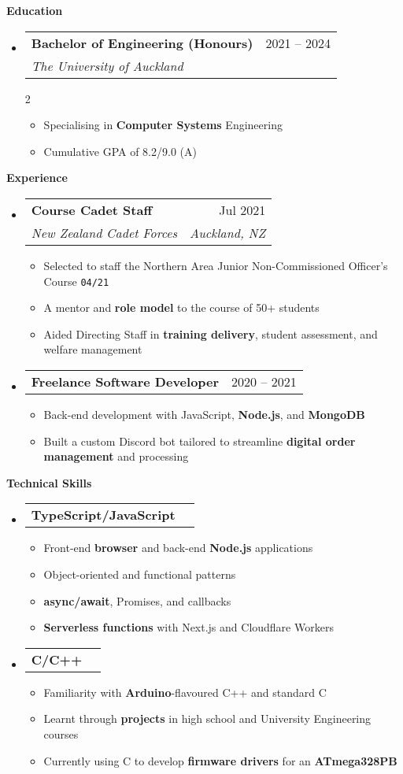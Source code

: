 \documentclass[11pt,a4paper]{article}[leftmargin=*]
\makeatletter
\def \entryspacing {-0pt}
\renewcommand{\section}[2]{\vspace{5pt}
  \colorbox{secondary}{\color{white}\raggedbottom\normalsize\textbf{{#1}{\hspace{7pt}#2}}}
}
\newcommand{\resumeEntryStart}{\begin{itemize}[leftmargin=2.5mm]}
\newcommand{\resumeEntryEnd}{\end{itemize}\vspace{\entryspacing}}
\newcommand{\resumeItemListStart}{\begin{itemize}[leftmargin=4.5mm]}
\newcommand{\resumeItemListEnd}{\end{itemize}}
\newcommand{\resumeItemListStartColumns}[2][-0.5]{\vspace*{#1\multicolsep}
\begin{multicols}{#2}\begin{itemize}[leftmargin=4.5mm]}
\newcommand{\resumeItemListEndColumns}[1][-0.5]{\end{itemize}\end{multicols}\vspace*{#1\multicolsep}}
\newcommand{\resumeItem}[1]{
  \item\small{
    {#1 \vspace{-2pt}}
  }
}
\newcommand{\resumeEntryTSDL}[4]{
  \vspace{-1pt}\item[]
    \begin{tabularx}{0.97\textwidth}{X@{\hspace{60pt}}r}
      \textbf{\color{primary}#1} & {\firabook\color{accent}\small#2} \\
      \textit{\color{accent}\small#3} & \textit{\color{accent}\small#4} \\
    \end{tabularx}\vspace{-6pt}
}
\newcommand{\resumeEntryTD}[2]{
  \vspace{-1pt}\item[]
    \begin{tabularx}{0.97\textwidth}{X@{\hspace{60pt}}r}
      \textbf{\color{primary}#1} & {\firabook\color{accent}\small#2} \\
    \end{tabularx}\vspace{-6pt}
}
\newcommand{\resumeBf}[1]{\small\textbf{\color{halfbold}#1}}
\makeatother
\begin{document}
\section{\faGraduationCap}{Education}

\resumeEntryStart
\resumeEntryTSDL
{Bachelor of Engineering (Honours)}{2021 -- 2024}
{The University of Auckland}{}
\resumeItemListStartColumns[0.5]{2}
\resumeItem {Specialising in \resumeBf{Computer Systems} Engineering}
\resumeItem {Cumulative GPA of 8.2/9.0 (A)}
\resumeItemListEndColumns
\resumeEntryEnd


\section{\faBriefcase}{Experience}

\resumeEntryStart
\resumeEntryTSDL
{Course Cadet Staff}{Jul 2021}
{New Zealand Cadet Forces}{Auckland, NZ}

\resumeItemListStart
\resumeItem {Selected to staff the Northern Area Junior Non-Commissioned Officer's Course \texttt{04/21}}
\resumeItem {A mentor and \resumeBf{role model} to the course of 50+ students}
\resumeItem {Aided Directing Staff in \resumeBf{training delivery}, student assessment, and welfare management}
\resumeItemListEnd
\resumeEntryEnd

\resumeEntryStart
\resumeEntryTD
{Freelance Software Developer}{2020 -- 2021}
\resumeItemListStart
\resumeItem {Back-end development with JavaScript, \resumeBf{Node.js}, and \resumeBf{MongoDB}}
\resumeItem {Built a custom Discord bot tailored to streamline \resumeBf{digital order management} and processing}
\resumeItemListEnd
\resumeEntryEnd


\section{\faCogs}{Technical Skills}

\resumeEntryStart
\resumeEntryTD
{TypeScript/JavaScript}{}
\resumeItemListStart
\resumeItem {Front-end \resumeBf{browser} and back-end \resumeBf{Node.js} applications}
\resumeItem {Object-oriented and functional patterns}
\resumeItem {\resumeBf{async/await}, Promises, and callbacks}
\resumeItem {\resumeBf{Serverless functions} with Next.js and Cloudflare Workers}
\resumeItemListEnd
\resumeEntryEnd

\resumeEntryStart
\resumeEntryTD
{C/C++}{}
\resumeItemListStart
\resumeItem {Familiarity with \resumeBf{Arduino}-flavoured C++ and standard C}
\resumeItem {Learnt through \resumeBf{projects} in high school and University Engineering courses}
\resumeItem {Currently using C to develop \resumeBf{firmware drivers} for an \resumeBf{ATmega328PB}}
\resumeItemListEnd
\resumeEntryEnd
\end{document}
